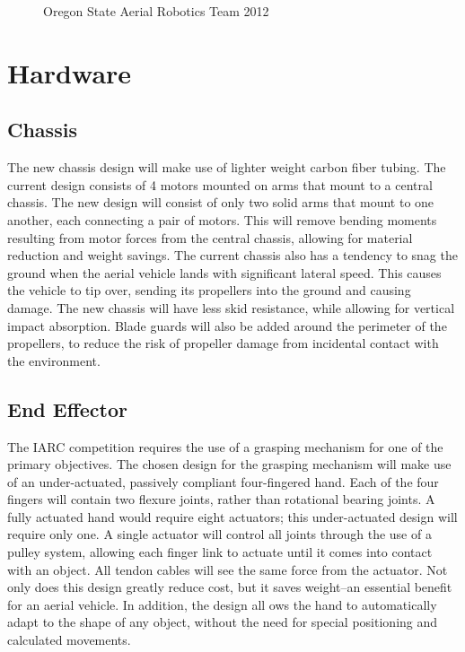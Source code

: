 \documentclass[12pt,letterpaper]{article}
\begin{document}
\begin{figure}[h!]
\caption{Oregon State Aerial Robotics Team 2012}
\end{figure}


\section*{Hardware}

\subsection*{Chassis}

The new chassis design will make use of lighter weight carbon fiber tubing.  The
 current design consists of 4 motors mounted on arms that mount to a central
chassis.  The new design will consist of only two solid arms that mount to one
another, each connecting a pair of motors.  This will remove bending moments
resulting from motor forces from the central chassis, allowing for material
reduction and weight savings.  The current chassis also has a tendency to snag
the ground when the aerial vehicle lands with significant lateral speed.  This
causes the vehicle to tip over, sending its propellers into the ground and
causing damage.  The new chassis will have less skid resistance, while allowing
for vertical impact absorption.  Blade guards will also be added around the
perimeter of the propellers, to reduce the risk of propeller damage from
incidental contact with the environment.


\subsection*{End Effector}

The IARC competition requires the use of a grasping mechanism for one of the
primary objectives.  The chosen design for the grasping mechanism will make use
of an under-actuated, passively compliant four-fingered hand.  Each of the four
fingers will contain two flexure joints, rather than rotational bearing joints.
A fully actuated hand would require eight actuators; this under-actuated design
will require only one.  A single actuator will control all joints through the
use of a pulley system, allowing each finger link to actuate until it comes into
 contact with an object.  All tendon cables will see the same force from the
actuator.  Not only does this design greatly reduce cost, but it saves
weight--an essential benefit for an aerial vehicle.  In addition, the design all
ows the hand to automatically adapt to the shape of any object, without the need
 for special positioning and calculated movements.
\end{document}
